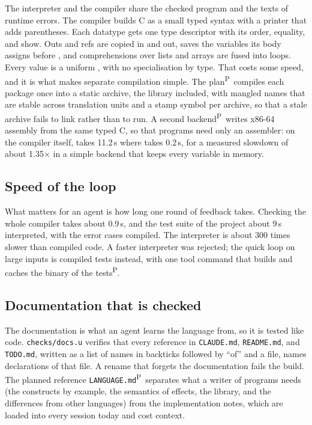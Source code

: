 \documentclass[11pt,a4paper]{article}
\newcommand{\code}[1]{\texttt{\detokenize{#1}}}
\newcommand{\file}[1]{\texttt{#1}}
\newcommand{\planned}{\textsuperscript{\textsf{\scriptsize P}}}
\begin{document}
The interpreter and the compiler share the checked program and the texts of runtime errors.
The compiler builds C as a small typed syntax with a printer that adds parentheses. Each
datatype gets one type descriptor with its order, equality, and show. Outs and refs are
copied in and out, \code{try} saves the variables its body assigns before \code{setjmp}, and
comprehensions over lists and arrays are fused into loops. Every value is a uniform
\code{u_value}, with no specialisation by type. That costs some speed, and it is what makes
separate compilation simple. The plan\planned\ compiles each package once into a static archive,
the library included, with mangled names that are stable across translation units and a stamp
symbol per archive, so that a stale archive fails to link rather than to run. A second
backend\planned\ writes x86-64 assembly from the same typed C, so that programs need only an assembler:
on the compiler itself, \code{cc -O2} takes 11.2\,s where \code{as} takes 0.2\,s, for a
measured slowdown of about 1.35$\times$ in a simple backend that keeps every variable in memory.

\subsection{Speed of the loop}

What matters for an agent is how long one round of feedback takes. Checking the whole
compiler takes about 0.9\,s, and the test suite of the project about 9\,s interpreted, with the
error cases compiled. The interpreter is about 300 times slower than compiled code. A faster
interpreter was rejected; the quick loop on large inputs is compiled tests instead, with one
tool command that builds and caches the binary of the tests\planned.

\subsection{Documentation that is checked}

The documentation is what an agent learns the language from, so it is tested like code.
\file{checks/docs.u} verifies that every reference in \file{CLAUDE.md}, \file{README.md}, and
\file{TODO.md}, written as a list of names in backticks followed by ``of'' and a file, names
declarations of that file. A rename that forgets the documentation fails the build. The
planned reference \file{LANGUAGE.md}\planned\ separates what a writer of programs needs (the
constructs by example, the semantics of effects, the library, and the differences from other
languages) from the implementation notes, which are loaded into every session today and
cost context.
\end{document}

